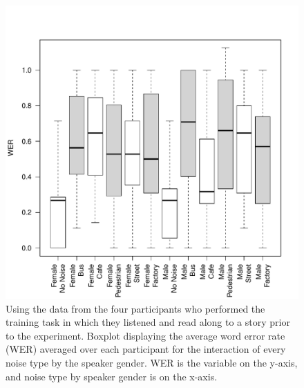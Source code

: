 \documentclass[dissertation,copyright]{uathesis}
\makeatletter
\def\maxwidth{ %
  \ifdim\Gin@nat@width>\linewidth
    \linewidth
  \else
    \Gin@nat@width
  \fi
}
\makeatother
\begin{document}
\begin{figure}

\includegraphics[width=\maxwidth]{figure/perc_boxplot_noiseXspkr-1} 

\caption{Using the data from the four participants who performed the training task in which they listened and read along to a story prior to the experiment.  Boxplot displaying the average word error rate (WER) averaged over each participant for the interaction of every noise type by the speaker gender. WER is the variable on the y-axis, and noise type by speaker gender is on the x-axis.}
\label{fig:perc_noiseXspkr_boxplot}
\end{figure}
\end{document}
